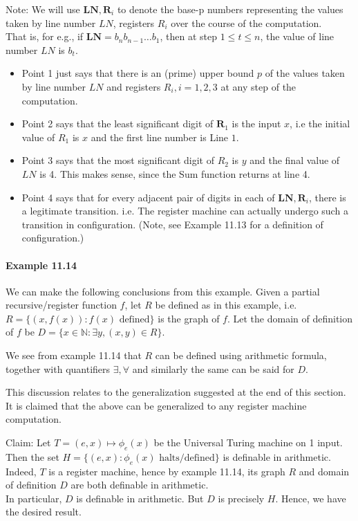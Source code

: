 \documentclass{article}
\begin{document}
Note: We will use $\mathbf{LN},\mathbf{R}_i$ to denote the base-p numbers representing the values taken by line number $LN$, registers $R_i$ over the course of the computation.\\
That is, for e.g., if $\mathbf{LN}=b_nb_{n-1}\dots b_1$, then at step $1\leq t\leq n$, the value of line number $LN$ is $b_t$.

\begin{itemize}
	\item Point 1 just says that there is an (prime) upper bound $p$ of the values taken by line number $LN$ and registers $R_i, i=1,2,3$ at any step of the computation.
	\item Point 2 says that the least significant digit of $\mathbf{R}_1$ is the input $x$, i.e the initial value of $R_1$ is $x$ and the first line number is Line $1$.
	\item Point 3 says that the most significant digit of $R_2$ is $y$ and the final value of $LN$ is 4. This makes sense, since the Sum function returns at line 4.
	\item Point 4 says that for every adjacent pair of digits in each of $\mathbf{LN},\mathbf{R}_i$, there is a legitimate transition. i.e. The register machine can actually undergo such a transition in configuration. (Note, see Example 11.13 for a definition of configuration.)
\end{itemize}

\paragraph{Example 11.14} We can make the following conclusions from this example. Given a partial recursive/register function $f$, let $R$ be defined as in this example, i.e. $R=\{(x,f(x)): f(x)\text{ defined}\}$ is the graph of $f$.
Let the domain of definition of $f$ be $D=\{x\in \mathbb{N}: \exists y, (x,y)\in R\}$.

We see from example 11.14 that $R$ can be defined using arithmetic formula, together with quantifiers $\exists,\forall$ and similarly the same can be said for $D$.

This discussion relates to the generalization suggested at the end of this section. It is claimed that the above can be generalized to any register machine computation.

Claim: Let $T=(e,x)\mapsto \phi_e(x)$ be the Universal Turing machine on 1 input. Then the set $H=\{(e,x): \phi_e(x) \text{ halts/defined}\}$ is definable in arithmetic. Indeed, $T$ is a register machine, hence by example 11.14, its graph $R$ and domain of definition $D$ are both definable in arithmetic.\\
In particular, $D$ is definable in arithmetic. But $D$ is precisely $H$. Hence, we have the desired result.
\end{document}
